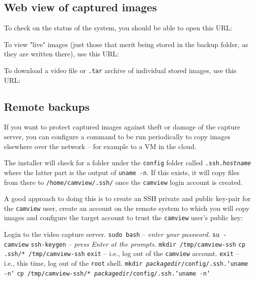   \subsection{Web view of captured images}

    To check on the status of the system, you should be able
    to open this URL:


    To view "live" images (just those that merit being stored
    in the backup folder, as they are written there), use this
    URL:


    To download a video file or \texttt{.tar} archive of
    individual stored images, use this URL:


  \subsection{Remote backups}

    If you want to protect captured images against theft or damage of
    the capture server, you can configure a command to be run periodically
    to copy images elsewhere over the network -- for example to a VM in
    the cloud.

    The installer will check for a folder under the \texttt{config} folder
    called \texttt{.ssh.\emph{hostname}} where the latter part is the output
    of \texttt{uname -n}.  If this exists, it will copy files from there
    to \texttt{/home/camview/.ssh/} once the \texttt{camview} login account
    is created.

    A good approach to doing this is to create an SSH private and public
    key-pair for the \texttt{camview} user, create an account on the remote
    system to which you will copy images and configure the target account to
    trust the \texttt{camview} user's public key:

    \BI
    \I Login to the video capture server.
    \I \texttt{sudo bash} -- \emph{enter your password}.
    \I \texttt{su - camview}
    \I \texttt{ssh-keygen} -- \emph{press Enter at the prompts.}
    \I \texttt{mkdir /tmp/camview-ssh}
    \I \texttt{cp .ssh/* /tmp/camview-ssh}
    \I \texttt{exit} -- i.e., log out of the \texttt{camview} account.
    \I \texttt{exit} -- i.e., this time, log out of the \texttt{root} shell.
    \I \texttt{mkdir \emph{packagedir}/config/.ssh.`uname -n`}
    \I \texttt{cp /tmp/camview-ssh/* \emph{packagedir}/config/.ssh.`uname -n`}
    \EI

